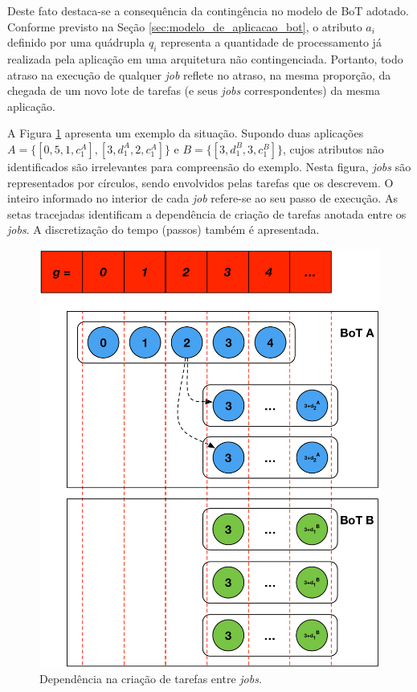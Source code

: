 \documentclass[tese,capa]{texufpel}
\begin{document}
Deste fato destaca-se a consequência da contingência no modelo de BoT adotado. Conforme previsto na Seção \ref{sec:modelo_de_aplicacao_bot}, o atributo $a_i$ definido por uma quádrupla $q_i$ representa a quantidade de processamento já realizada pela aplicação em uma arquitetura não contingenciada. Portanto, todo atraso na execução de qualquer \textit{job} reflete no atraso, na mesma proporção, da chegada de um novo lote de tarefas (e seus \textit{jobs} correspondentes) da mesma aplicação.

A Figura \ref{fig:normalizatempo} apresenta um exemplo da situação. Supondo duas aplicações $A = \{[0,5,1,c^A_1], [3,d^A_1,2,c^A_1]\}$ e $B = \{[3,d^B_1,3,c^B_1]\}$, cujos atributos não identificados são irrelevantes para compreensão do exemplo. Nesta figura, \textit{jobs} são representados por círculos, sendo envolvidos pelas tarefas que os descrevem. O inteiro informado no interior de cada \textit{job} refere-se ao seu passo de execução. As setas tracejadas identificam a dependência de criação de tarefas anotada entre os \textit{jobs}. A discretização do tempo (passos) também é apresentada.

\begin{figure}[htbp]
	\centerline{
		\includegraphics[scale=0.44]{images/NormalizacaoTempo2.pdf}}
	\caption[Dependência na criação de tarefas entre \textit{jobs}.]{Dependência na criação de tarefas entre \textit{jobs}.}
\label{fig:normalizatempo}
\end{figure}
\end{document}
